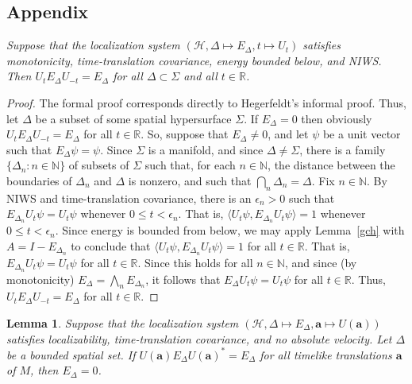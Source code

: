 \documentclass[11pt]{article}
\newtheorem{lemma}{Lemma}
\theoremstyle{remark}
\newcommand{\hil}[1]{\mathcal{#1}}
\begin{document}
\begin{appendix}
\section{Appendix}
  {\it Suppose that the 
  localization system $(\hil{H},\Delta \mapsto E_{\Delta},t\mapsto
  U_{t})$ satisfies monotonicity, time-translation covariance, energy
  bounded below, and NIWS.  Then $U_{t}E_{\Delta}U_{-t}=E_{\Delta}$
  for all $\Delta \subset \Sigma$ and all $t\in \mathbb{R}$. }

\begin{proof} The formal proof corresponds directly to Hegerfeldt's
  informal proof.  Thus, let $\Delta$ be a subset of some spatial
  hypersurface $\Sigma$.  If $E_{\Delta}=0$ then obviously
  $U_{t}E_{\Delta}U_{-t}=E_{\Delta}$ for all $t\in \mathbb{R}$.  So,
  suppose that $E_{\Delta}\neq 0$, and let $\psi$ be a unit vector
  such that $E_{\Delta}\psi =\psi$.  Since $\Sigma$ is a manifold, and
  since $\Delta \neq \Sigma$, there is a family $\{ \Delta _{n}:n\in
  \mathbb{N} \}$ of subsets of $\Sigma$ such that, for each $n\in
  \mathbb{N}$, the distance between the boundaries of $\Delta _{n}$
  and $\Delta$ is nonzero, and such that $\bigcap _{n}\Delta
  _{n}=\Delta$.  Fix $n \in \mathbb{N}$.  By NIWS and time-translation
  covariance, there is an $\epsilon _{n}>0$ such that $E_{\Delta
    _{n}}U_{t}\psi = U_{t}\psi$ whenever $0\leq t< \epsilon _{n}$.
  That is, $\langle U_{t}\psi ,E_{\Delta _{n}}U_{t}\psi \rangle =1$
  whenever $0\leq t < \epsilon _{n}$.  Since energy is bounded from
  below, we may apply Lemma~\ref{gch} with $A=I-E_{\Delta _{n}}$ to
  conclude that $\langle U_{t}\psi ,E_{\Delta _{n}}U_{t}\psi \rangle
  =1$ for all $t\in \mathbb{R}$.  That is, $E_{\Delta _{n}}U_{t}\psi
  =U_{t}\psi$ for all $t\in \mathbb{R}$.  Since this holds for all
  $n\in \mathbb{N}$, and since (by monotonicity) $E_{\Delta}=\bigwedge
  _{n}E_{\Delta _{n}}$, it follows that $E_{\Delta}U_{t}\psi
  =U_{t}\psi$ for all $t\in \mathbb{R}$.  Thus, $U_{t}E_{\Delta
    }U_{-t}=E_{\Delta}$ for all $t\in \mathbb{R}$.
\end{proof}

\begin{lemma} Suppose that the localization system $(\hil{H},\Delta \mapsto
  E_{\Delta},\mathbf{a}\mapsto U(\mathbf{a}))$ satisfies
  localizability, time-translation covariance, and no absolute
  velocity.  Let $\Delta$ be a bounded spatial set.  If
  $U(\mathbf{a})E_{\Delta}U(\mathbf{a})^{*}=E_{\Delta}$ for all
  timelike translations $\mathbf{a}$ of $M$, then $E_{\Delta}=0$.
  \label{zowwy}
\end{lemma}


\end{appendix}
\end{document}
